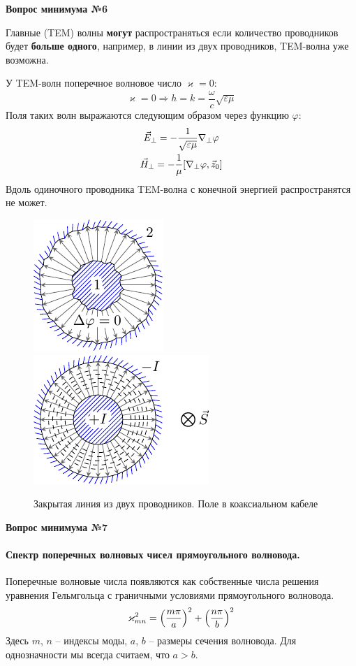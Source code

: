 \documentclass[a4paper,14pt]{extarticle}
\newcommand{\ticket}[1] {
\newpage
\hypertarget{num#1}{}
\begin{center}
	\textbf{Вопрос минимума №#1 }
\end{center}
}
\begin{document}
\ticket{6}
Главные (TEM) волны \textbf{могут} распространяться если количество проводников будет \textbf{больше одного}, например,
в линии из двух проводников, TEM-волна уже возможна.

У TEM-волн поперечное волновое число $\varkappa=0$:
\begin{equation*}
\varkappa=0 \Rightarrow h=k= \frac{\omega}{c}\sqrt{\varepsilon \mu}
\end{equation*}
Поля таких волн выражаются следующим образом через функцию $\varphi$:
\begin{gather*}
\label{eperp}
\vec{E}_\perp=-\frac{1}{\sqrt{\varepsilon \mu}}\nabla_\perp \varphi\\
\vec{H}_\perp=-\frac{1}{\mu}\qty[\nabla_\perp \varphi,\vec{z}_0]
\end{gather*}
Вдоль одиночного проводника TEM-волна с конечной энергией распространятся не может.
\begin{figure}[h!]
	\centering
	\includegraphics[scale=1.5]{img/lect4_ris4}
	\includegraphics[scale=1.5]{img/lect4_ris6}
	\caption{Закрытая линия из двух проводников. Поле в коаксиальном кабеле}
	\label{fig:lect4:4}
\end{figure}







\ticket{7}
\paragraph{Спектр поперечных волновых чисел прямоугольного волновода. } Поперечные волновые числа появляются как
собственные числа решения уравнения Гельмгольца с граничными условиями прямоугольного волновода. 
\begin{equation}
	\varkappa^2_{mn} = \qty(\frac{m\pi}{a})^2+
		\qty(\frac{n\pi}{b})^2
\end{equation}
Здесь $m$, $n$ -- индексы моды, $a$, $b$ -- размеры сечения волновода. Для однозначности мы всегда считаем, что $a>b$.
\end{document}
